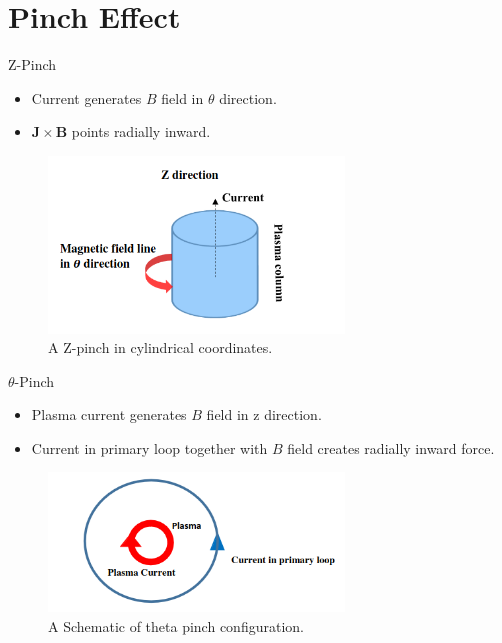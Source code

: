 \section{Pinch Effect}
\begin{frame} {Z-Pinch}
    \begin{itemize}
        \item Current generates $B$ field in $\theta$ direction.
        \item $\mathbf{J\times B}$ points radially inward.
    \end{itemize}
    \begin{figure}
        \centering
        \includegraphics[width=0.7\textwidth]{figures/z-pinch.png}
        \caption{A Z-pinch in cylindrical coordinates. \cite{behbahani_2017_enhancement}}
        \label{fig:z-pinch}
    \end{figure}
\end{frame}

\begin{frame} {$\theta$-Pinch}
    \begin{itemize}
        \item Plasma current generates $B$ field in z direction.
        \item Current in primary loop together with $B$ field creates radially inward force.
    \end{itemize}
    \begin{figure}
        \centering
        \includegraphics[width=0.7\textwidth]{figures/theta-pinch.png}
        \caption{A Schematic of theta pinch configuration. \cite{behbahani_2017_enhancement}}
        \label{fig:theta-pinch}
    \end{figure}
\end{frame}

